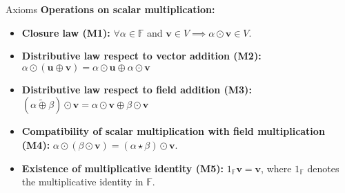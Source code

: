 \documentclass[11pt]{beamer}
\theoremstyle{plain}
\begin{document}
\begin{frame}{Axioms}
    \textbf{Operations on scalar multiplication:}
\begin{itemize}
    \item \textbf{Closure law (M1):} $\forall\alpha\in\mathbb F$ and $\mathbf{v}\in V\implies \alpha\odot\mathbf{v}\in V$.
    \item \textbf{Distributive law respect to vector addition (M2):} $\alpha \odot (\mathbf{u}\oplus\mathbf{v})=\alpha\odot\mathbf{u}\oplus\alpha\odot\mathbf{v}$
    \item \textbf{Distributive law respect to field addition (M3):} $(\alpha\tilde\oplus \beta)\odot \mathbf{v}=\alpha\odot \mathbf{v}\oplus \beta\odot\mathbf{v}$
    \item \textbf{Compatibility of scalar multiplication with field multiplication (M4):} $\alpha\odot(\beta \odot \mathbf{v})=(\alpha \star \beta)\odot \mathbf{v}$.
    \item \textbf{Existence of multiplicative identity (M5):} $1_{\mathbb F} \mathbf{v}=\mathbf{v}$, where $1_{\mathbb F}$ denotes the multiplicative identity in $\mathbb F$.
\end{itemize}
\end{frame}
\end{document}
